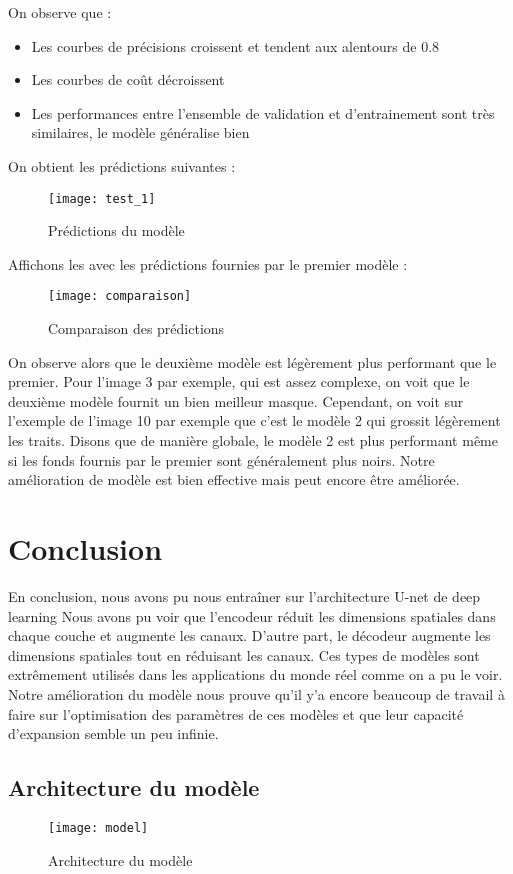 \documentclass[12pt,a4paper,titlepage]{article}
\begin{document}
On observe que :

\begin{itemize}
    \item{Les courbes de précisions croissent et tendent aux alentours de 0.8}
    \item{Les courbes de coût décroissent}
    \item{Les performances entre l'ensemble de validation et d'entrainement sont très similaires,
        le modèle généralise bien}
\end{itemize}

On obtient les prédictions suivantes :

\begin{figure}[H]
    \caption{Prédictions du modèle}
    \texttt{[image: test\_1]}
    \centering
\end{figure}

Affichons les avec les prédictions fournies par le premier modèle :

\begin{figure}[H]
    \caption{Comparaison des prédictions}
    \texttt{[image: comparaison]}
    \centering
\end{figure}

On observe alors que le deuxième modèle est légèrement plus performant que le premier.
Pour l'image 3 par exemple, qui est assez complexe, on voit que le deuxième modèle fournit un
bien meilleur masque. Cependant, on voit sur l'exemple de l'image 10 par exemple que c'est le modèle 2 qui grossit
légèrement les traits. Disons que de manière globale, le modèle 2 est plus performant même si
les fonds fournis par le premier sont généralement plus noirs. Notre amélioration de modèle
est bien effective mais peut encore être améliorée.

\section*{Conclusion}
En conclusion, nous avons pu nous entraîner sur l'architecture U-net de deep learning
Nous avons pu voir que l'encodeur réduit les dimensions spatiales dans chaque couche et
augmente les canaux. D'autre part, le décodeur augmente les dimensions spatiales tout en
réduisant les canaux. Ces types de modèles sont extrêmement utilisés dans les applications du
monde réel comme on a pu le voir. Notre amélioration du modèle nous prouve qu'il y'a encore
beaucoup de travail à faire sur l'optimisation des paramètres de ces modèles et que leur
capacité d'expansion semble un peu infinie.

\begin{appendices}

    \section{Architecture du modèle}

    \begin{figure}[H]
        \caption{Architecture du modèle}
        \texttt{[image: model]}
        \centering
    \end{figure}

\end{appendices}
\end{document}
